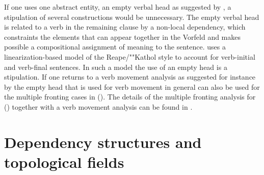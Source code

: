 If one uses one abstract entity, an empty verbal head as suggested
by \citet{Mueller2002c}, a stipulation of several constructions would be unnecessary. The
empty verbal head is related to a verb in the remaining clause by a non-local dependency,
which constraints the elements that can appear together in the Vorfeld and makes possible a compositional
assignment of meaning to the sentence.
\citet{Mueller2002c} uses a linearization-based model of the Reape/""Kathol style
to account for verb-initial and verb-final sentences. In such a model the use of an empty
head is a stipulation. If one returns to a verb movement analysis as suggested 
for instance by  the empty head that is used for verb movement in general
can also be used for the multiple fronting cases in (). The details of the multiple
fronting analysis for () together with a verb movement analysis can be found in .
%
\nocite{Reape90a,Reape94a}



\section{Dependency structures and topological fields}




